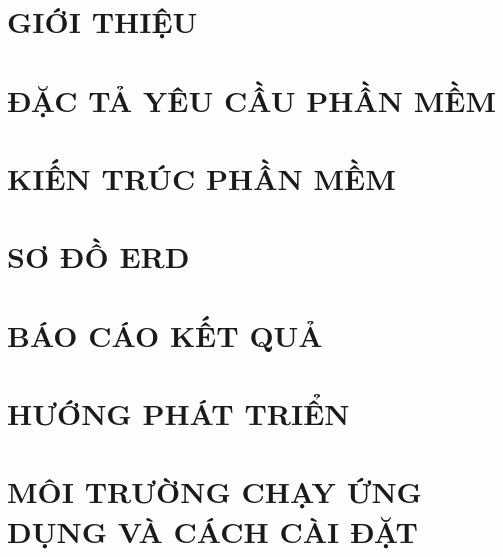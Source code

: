 \documentclass[a4paper,12pt]{report}
\begin{document}


\tableofcontents
\listoffigures
\newpage



\newpage

\chapter{GIỚI THIỆU}



\chapter{ĐẶC TẢ YÊU CẦU PHẦN MỀM}


\chapter{KIẾN TRÚC PHẦN MỀM}



\chapter{SƠ ĐỒ ERD}




\chapter{BÁO CÁO KẾT QUẢ}


\chapter{HƯỚNG PHÁT TRIỂN}


\chapter{MÔI TRƯỜNG CHẠY ỨNG DỤNG VÀ CÁCH CÀI ĐẶT}

\end{document}
